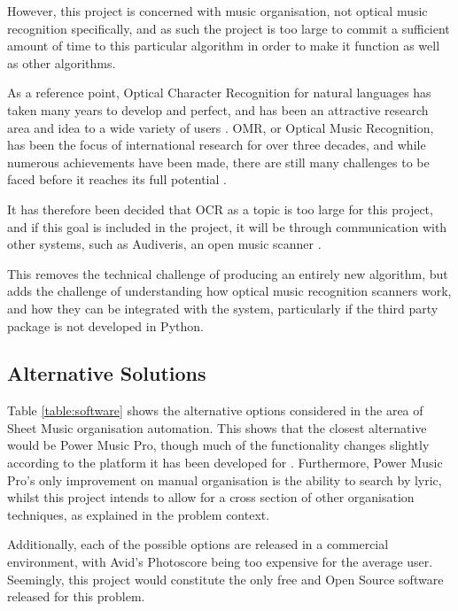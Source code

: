 However, this project is concerned with music organisation, not optical music recognition specifically, and as such the project is too large to commit a sufficient amount of time to this particular algorithm in order to make it function as well as other algorithms. 

As a reference point, Optical Character Recognition for natural languages has taken many years to develop and perfect, and has been an attractive research area and idea to a wide variety of users \parencite{InternationalConf}. OMR, or Optical Music Recognition, has been the focus of international research for over three decades, and while numerous achievements have been made, there are still many challenges to be faced before it reaches its full potential \parencite{musicocr}. 

It has therefore been decided that OCR as a topic is too large for this project, and if this goal is included in the project, it will be through communication with other systems, such as Audiveris, an open music scanner \parencite{audiveris}. 

This removes the technical challenge of producing an entirely new algorithm, but adds the challenge of understanding how optical music recognition scanners work, and how they can be integrated with the system, particularly if the third party package is not developed in Python.

\subsection{Alternative Solutions}
Table \ref{table:software} shows the alternative options considered in the area of Sheet Music organisation automation. This shows that the closest alternative would be Power Music Pro, though much of the functionality changes slightly according to the platform it has been developed for \parencite{PowerMusic}. Furthermore, Power Music Pro's only improvement on manual organisation is the ability to search by lyric, whilst this project intends to allow for a cross section of other organisation techniques, as explained in the problem context.

Additionally, each of the possible options are released in a commercial environment, with Avid's Photoscore being too expensive for the average user.  Seemingly, this project would constitute the only free and Open Source software released for this problem.

